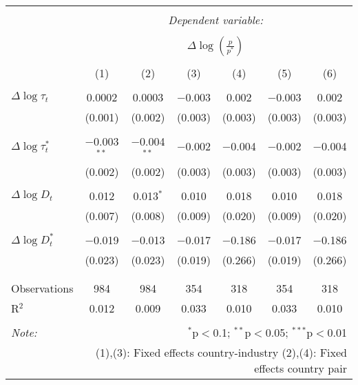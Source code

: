 
\begin{tabular}{@{\extracolsep{5pt}}lcccccc} 
\\[-1.8ex]\hline 
\hline \\[-1.8ex] 
 & \multicolumn{6}{c}{\textit{Dependent variable:}} \\ 
\cline{2-7} 
\\[-1.8ex] & \multicolumn{6}{c}{$\Delta \log \left(\frac{p}{p^*} \right)$} \\ 
\\[-1.8ex] & (1) & (2) & (3) & (4) & (5) & (6)\\ 
\hline \\[-1.8ex] 
 $\Delta \log \tau_t$ & 0.0002 & 0.0003 & $-$0.003 & 0.002 & $-$0.003 & 0.002 \\ 
  & (0.001) & (0.002) & (0.003) & (0.003) & (0.003) & (0.003) \\ 
  & & & & & & \\ 
 $\Delta \log \tau_t^*$ & $-$0.003$^{**}$ & $-$0.004$^{**}$ & $-$0.002 & $-$0.004 & $-$0.002 & $-$0.004 \\ 
  & (0.002) & (0.002) & (0.003) & (0.003) & (0.003) & (0.003) \\ 
  & & & & & & \\ 
 $\Delta \log D_t$ & 0.012 & 0.013$^{*}$ & 0.010 & 0.018 & 0.010 & 0.018 \\ 
  & (0.007) & (0.008) & (0.009) & (0.020) & (0.009) & (0.020) \\ 
  & & & & & & \\ 
 $\Delta \log D_t^*$ & $-$0.019 & $-$0.013 & $-$0.017 & $-$0.186 & $-$0.017 & $-$0.186 \\ 
  & (0.023) & (0.023) & (0.019) & (0.266) & (0.019) & (0.266) \\ 
  & & & & & & \\ 
\hline \\[-1.8ex] 
Observations & 984 & 984 & 354 & 318 & 354 & 318 \\ 
R$^{2}$ & 0.012 & 0.009 & 0.033 & 0.010 & 0.033 & 0.010 \\ 
\hline 
\hline \\[-1.8ex] 
\textit{Note:}  & \multicolumn{6}{r}{$^{*}$p$<$0.1; $^{**}$p$<$0.05; $^{***}$p$<$0.01} \\ 
 & \multicolumn{6}{r}{(1),(3): Fixed effects country-industry (2),(4): Fixed effects country pair} \\ 
\end{tabular} 
